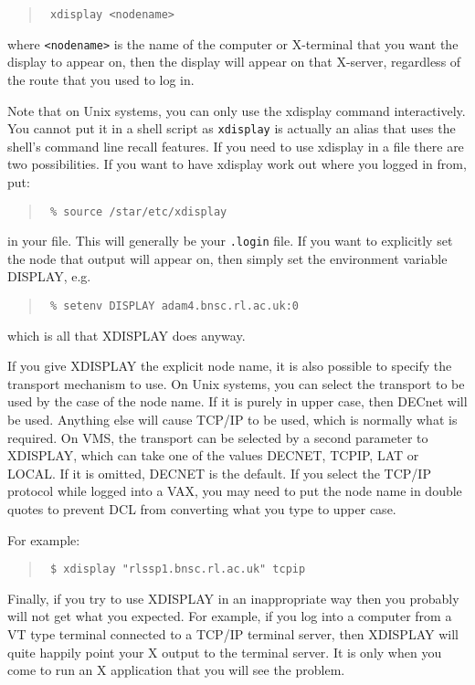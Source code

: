 \begin{quote}{\tt
xdisplay <nodename>
}
\end{quote}

where {\tt <nodename>} is the name of the computer or X-terminal that you want
the display to appear on, then the display will appear on that X-server,
regardless of the route that you used to log in.

Note that on Unix systems, you can only use the xdisplay command interactively.
You cannot put it in a shell script as {\tt xdisplay} is actually an alias that
uses the shell's command line recall features. If you need to use xdisplay in a
file there are two possibilities. If you want to have xdisplay work out where
you logged in from, put:

\begin{quote}{\tt
\% source /star/etc/xdisplay
}
\end{quote}

in your file. This will generally be your {\tt .login} file. If you want to
explicitly set the node that output will appear on, then simply set the
environment variable DISPLAY, e.g.

\begin{quote}{\tt
\% setenv DISPLAY adam4.bnsc.rl.ac.uk:0
}
\end{quote}

which is all that XDISPLAY does anyway.

If you give XDISPLAY the explicit node name, it is also possible to specify the
transport mechanism to use. On Unix systems, you can select the transport to be
used by the case of the node name. If it is purely in upper case, then DECnet
will be used. Anything else will cause TCP/IP to be used, which is normally
what is required. On VMS, the transport can be selected by a second parameter
to XDISPLAY, which can take one of the values DECNET, TCPIP, LAT or LOCAL. If
it is omitted, DECNET is the default. If you select the TCP/IP protocol while
logged into a VAX, you may need to put the node name in double quotes to
prevent DCL from converting what you type to upper case.

For example:

\begin{quote}{\tt
\$ xdisplay "rlssp1.bnsc.rl.ac.uk" tcpip
}
\end{quote}

Finally, if you try to use XDISPLAY in an inappropriate way then you probably
will not get what you expected. For example, if you log into a computer from a
VT type terminal connected to a TCP/IP terminal server, then XDISPLAY will quite
happily point your X output to the terminal server. It is only when you come to
run an X application that you will see the problem.


